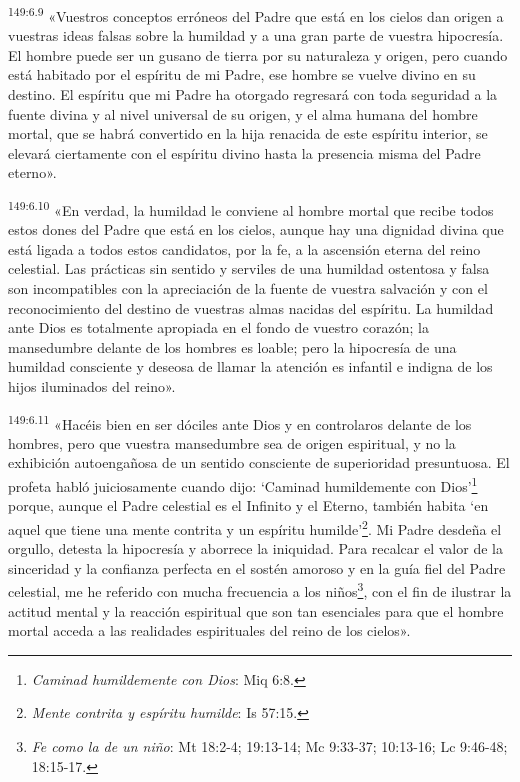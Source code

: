 \par 
\textsuperscript{149:6.9} «Vuestros conceptos erróneos del Padre que está en los cielos dan origen a vuestras ideas falsas sobre la humildad y a una gran parte de vuestra hipocresía. El hombre puede ser un gusano de tierra por su naturaleza y origen, pero cuando está habitado por el espíritu de mi Padre, ese hombre se vuelve divino en su destino. El espíritu que mi Padre ha otorgado regresará con toda seguridad a la fuente divina y al nivel universal de su origen, y el alma humana del hombre mortal, que se habrá convertido en la hija renacida de este espíritu interior, se elevará ciertamente con el espíritu divino hasta la presencia misma del Padre eterno».

\par 
\textsuperscript{149:6.10} «En verdad, la humildad le conviene al hombre mortal que recibe todos estos dones del Padre que está en los cielos, aunque hay una dignidad divina que está ligada a todos estos candidatos, por la fe, a la ascensión eterna del reino celestial. Las prácticas sin sentido y serviles de una humildad ostentosa y falsa son incompatibles con la apreciación de la fuente de vuestra salvación y con el reconocimiento del destino de vuestras almas nacidas del espíritu. La humildad ante Dios es totalmente apropiada en el fondo de vuestro corazón; la mansedumbre delante de los hombres es loable; pero la hipocresía de una humildad consciente y deseosa de llamar la atención es infantil e indigna de los hijos iluminados del reino».

\par 
\textsuperscript{149:6.11} «Hacéis bien en ser dóciles ante Dios y en controlaros delante de los hombres, pero que vuestra mansedumbre sea de origen espiritual, y no la exhibición autoengañosa de un sentido consciente de superioridad presuntuosa. El profeta habló juiciosamente cuando dijo: `Caminad humildemente con Dios'\footnote{\textit{Caminad humildemente con Dios}: Miq 6:8.} porque, aunque el Padre celestial es el Infinito y el Eterno, también habita `en aquel que tiene una mente contrita y un espíritu humilde'\footnote{\textit{Mente contrita y espíritu humilde}: Is 57:15.}. Mi Padre desdeña el orgullo, detesta la hipocresía y aborrece la iniquidad. Para recalcar el valor de la sinceridad y la confianza perfecta en el sostén amoroso y en la guía fiel del Padre celestial, me he referido con mucha frecuencia a los niños\footnote{\textit{Fe como la de un niño}: Mt 18:2-4; 19:13-14; Mc 9:33-37; 10:13-16; Lc 9:46-48; 18:15-17.}, con el fin de ilustrar la actitud mental y la reacción espiritual que son tan esenciales para que el hombre mortal acceda a las realidades espirituales del reino de los cielos».

